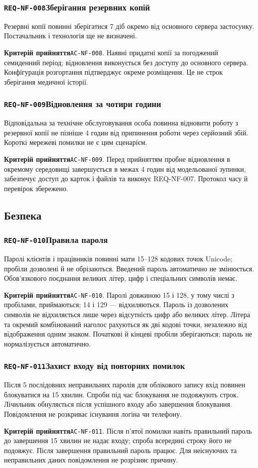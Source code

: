 \documentclass[11pt,a4paper]{article}
\newcommand{\requirement}[4]{%
  \Needspace{7\baselineskip}%
  \subsubsection*{\hypertarget{#1}{\texttt{#1}}\quad #2}%
  #3\par
  \textbf{Критерій прийняття}\quad #4\par\medskip}
\begin{document}
\requirement{REQ-NF-008}{Зберігання резервних копій}{Резервні копії повинні зберігатися 7 діб окремо від основного сервера застосунку. Постачальник і технологія ще не визначені.}{\hypertarget{AC-NF-008}{\texttt{AC-NF-008}}. Наявні придатні копії за погоджений семиденний період; відновлення виконується без доступу до основного сервера. Конфігурація розгортання підтверджує окреме розміщення. Це не строк зберігання медичної історії.}

\requirement{REQ-NF-009}{Відновлення за чотири години}{Відповідальна за технічне обслуговування особа повинна відновити роботу з резервної копії не пізніше 4 годин від припинення роботи через серйозний збій. Короткі мережеві помилки не є цим сценарієм.}{\hypertarget{AC-NF-009}{\texttt{AC-NF-009}}. Перед прийняттям пробне відновлення в окремому середовищі завершується в межах 4 годин від модельованої зупинки, забезпечує доступ до карток і файлів та виконує REQ-NF-007. Протокол часу й перевірок збережено.}

\subsection{Безпека}
\requirement{REQ-NF-010}{Правила пароля}{Паролі клієнтів і працівників повинні мати 15–128 кодових точок Unicode; пробіли дозволені й не обрізаються. Введений пароль автоматично не змінюється. Обов’язкового поєднання великих літер, цифр і спеціальних символів немає.}{\hypertarget{AC-NF-010}{\texttt{AC-NF-010}}. Паролі довжиною 15 і 128, у тому числі з пробілами, приймаються; 14 і 129 — відхиляються. Пароль із дозволених символів не відхиляється лише через відсутність цифр або великих літер. Літера та окремий комбінований наголос рахуються як дві кодові точки, незалежно від відображення одним знаком. Початкові й кінцеві пробіли зберігаються; пароль не нормалізується автоматично.}

\requirement{REQ-NF-011}{Захист входу від повторних помилок}{Після 5 послідовних неправильних паролів для облікового запису вхід повинен блокуватися на 15 хвилин. Спроби під час блокування не подовжують строк. Лічильник обнуляється після успішного входу або завершення блокування. Повідомлення не розкриває існування логіна чи телефону.}{\hypertarget{AC-NF-011}{\texttt{AC-NF-011}}. Після п’ятої помилки навіть правильний пароль до завершення 15 хвилин не надає входу; спроба всередині строку його не подовжує. Після завершення правильний пароль працює. Для неіснуючих та неправильних даних повідомлення не розрізняє причину.}
\end{document}
